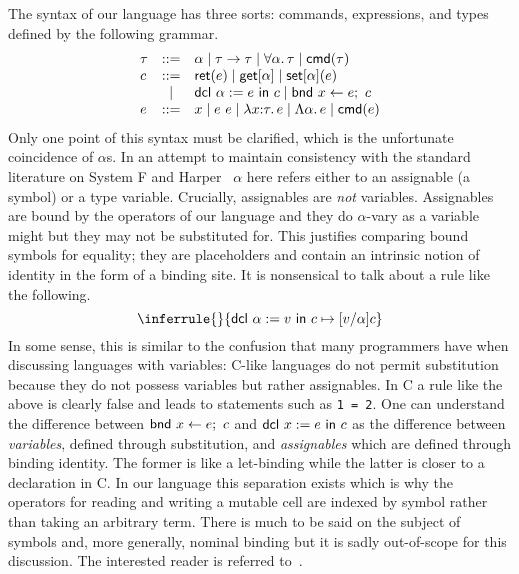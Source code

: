 The syntax of our language has three sorts: commands, expressions, and
types defined by the following grammar.
\[
  \begin{array}{lcl}
    \tau & ::= & \alpha \mid \tau \to \tau \mid \forall \alpha.\, \tau
    \mid \mathsf{cmd}(\tau)\\
    c & ::= & \mathsf{ret}(e) \mid \mathsf{get}[\alpha] \mid \mathsf{set}[\alpha](e) \\
      & \mid & \mathsf{dcl}\ \alpha := e\ \mathsf{in}\ c \mid \mathsf{bnd}\ x \gets e;\ c\\
    e & ::= & x \mid e\ e \mid \lambda x {:} \tau.\, e \mid
              \Lambda \alpha.\, e \mid \mathsf{cmd}(e)
  \end{array}
\]
Only one point of this syntax must be clarified, which is the
unfortunate coincidence of $\alpha$s. In an attempt to maintain
consistency with the standard literature on System F and
Harper~\citep{Harper:16} $\alpha$ here refers either to an assignable
(a symbol) or a type variable. Crucially, assignables are \emph{not}
variables. Assignables are bound by the operators of our language and
they do $\alpha$-vary as a variable might but they may not be
substituted for. This justifies comparing bound symbols for equality;
they are placeholders and contain an intrinsic notion of identity in
the form of a binding site. It is nonsensical to talk about a rule
like the following.
\[
  \inferrule{ }{\step{\dcl{\alpha}{v}{c}}{[v/\alpha]c}}
\]
In some sense, this is similar to the confusion that many programmers
have when discussing languages with variables: C-like languages do not
permit substitution because they do not possess variables but rather
assignables. In C a rule like the above is clearly false and leads to
statements such as \verb+1 = 2+. One can understand the difference
between $\mathsf{bnd}\ x \gets e;\ c$ and $\mathsf{dcl}\ x := e\ \mathsf{in}\ c$ as the difference between
\emph{variables}, defined through substitution, and \emph{assignables}
which are defined through binding identity. The former is like a
let-binding while the latter is closer to a declaration in C. In our
language this separation exists which is why the operators for reading
and writing a mutable cell are indexed by symbol rather than taking an
arbitrary term. There is much to be said on the subject of symbols
and, more generally, nominal binding but it is sadly out-of-scope for
this discussion. The interested reader is referred
to~\citep{Pitts:13}.

